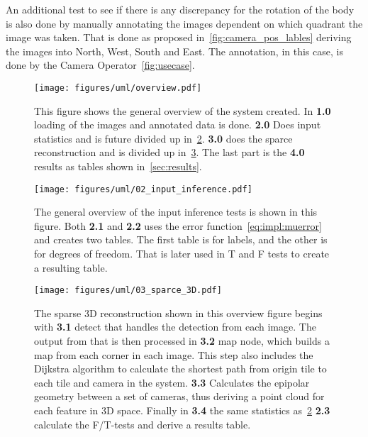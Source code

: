 An additional test to see if there is any discrepancy for the rotation of the body is also done by manually annotating the images dependent on which quadrant
the image was taken.
That is done as proposed in~\ref{fig:camera_pos_lables} deriving the images into North, West, South and East.
The annotation, in this case, is done by the Camera Operator~\ref{fig:usecase}.





\begin{figure}
\begin{center}
    \texttt{[image: figures/uml/overview.pdf]}
\end{center}
\caption{This figure shows the general overview of the system created. In \textbf{1.0} loading of the images and annotated data is done.
    \textbf{2.0} Does input statistics and is future divided up in~\ref{fig:method:inference}. \textbf{3.0} does the sparce reconstruction and is divided up in~\ref{fig:method:sparce3d}.
The last part is the \textbf{4.0} results as tables shown in~\ref{sec:results}.}\label{fig:method:overview}
\end{figure}

\begin{figure}
\begin{center}
    \texttt{[image: figures/uml/02\_input\_inference.pdf]}
\end{center}
\caption{The general overview of the input inference tests is shown in this figure.
    Both \textbf{2.1} and \textbf{2.2} uses the error function~\ref{eq:impl:muerror} and creates two tables. The first table is for labels, and the other is for degrees of freedom. That is later used in T and F tests to create a resulting table.
}
\label{fig:method:inference}
\end{figure}


\begin{figure}
    \begin{center}
        \texttt{[image: figures/uml/03\_sparce\_3D.pdf]}
    \end{center}
    \caption{The sparse 3D reconstruction shown in this overview figure begins with \textbf{3.1} detect that handles the \aruco{ } detection from each image.
        The output from that is then processed in \textbf{3.2} map node, which builds a map from each corner in each image. This step also includes the Dijkstra algorithm to calculate the shortest path from \aruco{ } origin tile to each tile and camera in the system.
        \textbf{3.3} Calculates the epipolar geometry between a set of cameras, thus deriving a point cloud for each feature in 3D space.
        Finally in \textbf{3.4} the same statistics as~\ref{fig:method:inference} \textbf{2.3} calculate the F/T-tests and derive a results table.
    }\label{fig:method:sparce3d}
\end{figure}





